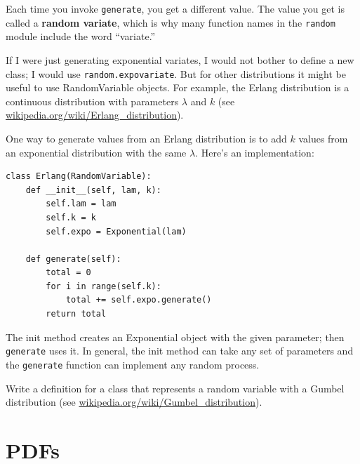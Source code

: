 \documentclass[12pt]{book}
\begin{document}
Each time you invoke {\tt generate}, you get a different value.  The
value you get is called a {\bf random variate}, which is why many
function names in the {\tt random} module include the word ``variate.''


If I were just generating exponential variates, I would not bother to
define a new class; I would use {\tt random.expovariate}.  But for
other distributions it might be useful to use RandomVariable objects.
For example, the Erlang distribution is a continuous distribution with
parameters $\lambda$ and $k$ (see
\url{wikipedia.org/wiki/Erlang_distribution}).


One way to generate values from an Erlang distribution is to add
$k$ values from an exponential distribution with the same $\lambda$.
Here's an implementation:

\begin{verbatim}
class Erlang(RandomVariable):
    def __init__(self, lam, k):
        self.lam = lam
        self.k = k
        self.expo = Exponential(lam)

    def generate(self):
        total = 0
        for i in range(self.k):
            total += self.expo.generate()
        return total
\end{verbatim}

The init method creates an Exponential object with the given
parameter; then {\tt generate} uses it.  In general, the init method
can take any set of parameters and the {\tt generate} function can
implement any random process.

\begin{exercise}
Write a definition for a class that represents a random variable
with a Gumbel distribution (see \url{wikipedia.org/wiki/Gumbel_distribution}).

\end{exercise}


\section{PDFs}
\label{density}


\end{document}
